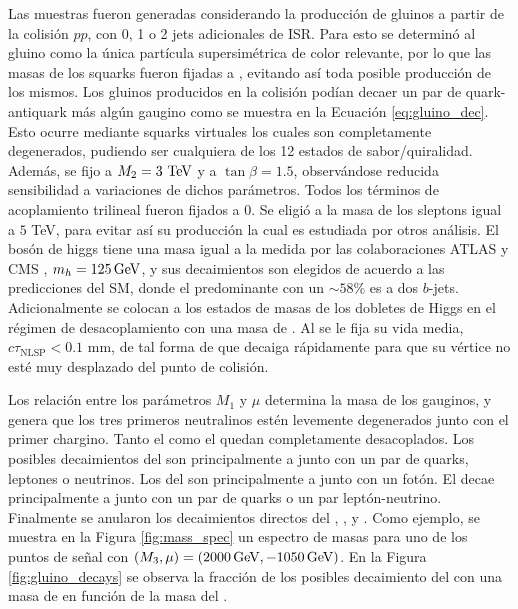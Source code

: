 Las muestras fueron generadas considerando la producción de gluinos a partir de la colisión $pp$, con 0, 1 o 2 jets adicionales de ISR. Para esto se determinó al gluino como la única partícula supersimétrica de color relevante, por lo que las masas de los squarks fueron fijadas a , evitando así toda posible producción de los mismos. Los gluinos producidos en la colisión podían decaer un par de quark-antiquark más algún gaugino como se muestra en la Ecuación \ref{eq:gluino_dec}. Esto ocurre mediante squarks virtuales los cuales son completamente degenerados, pudiendo ser cualquiera de los 12 estados de sabor/quiralidad.
Además, se fijo a $M_2=3\ \text{TeV}$ y a $\tan{\beta}=1.5$, observándose reducida sensibilidad a variaciones de dichos parámetros. Todos los términos de acoplamiento trilineal fueron fijados a 0. Se eligió a la masa de los sleptons igual a $5$ TeV, para evitar así su producción la cual es estudiada por otros análisis. El bosón de higgs tiene una masa igual a la medida por las colaboraciones ATLAS y CMS \cite{higgs_mass}, $m_h=125\,\text{GeV}$, y sus decaimientos son elegidos de acuerdo a las predicciones del SM, 
donde el predominante con un $\sim58$\% es a dos $b$-jets.
Adicionalmente se colocan a los estados de masas de los dobletes de Higgs en el régimen de desacoplamiento con una masa de .
Al \ninoone se le fija su vida media, $c\tau_{\text{NLSP}}<0.1$ mm, de tal forma de que decaiga rápidamente  para que su vértice no esté muy desplazado del punto de colisión. 


Los relación entre los parámetros $M_1$ y $\mu$ determina la masa de los gauginos, y genera que los tres primeros neutralinos estén levemente degenerados junto con el primer chargino. Tanto el \ninofour como el \chinotwopm quedan completamente desacoplados. Los posibles decaimientos del \ninotwo son principalmente a \ninoone junto con un par de quarks, leptones o neutrinos. Los del \ninothree son principalmente a \ninoone junto con un fotón. El \chinoonepm decae principalmente a \ninoone junto con un par de quarks o un par leptón-neutrino. Finalmente se anularon los decaimientos directos del \gluino, \ninotwo, \ninothree y \chinoonepm. Como ejemplo, se muestra en la Figura \ref{fig:mass_spec} un espectro de masas para uno de los puntos de señal con $(M_3, \mu) = (2000\,\text{GeV}, -1050\,\text{GeV})$. En la Figura \ref{fig:gluino_decays} se observa la fracción de los posibles decaimiento del \gluino con una masa de  en función de la masa del \ninoone. 

